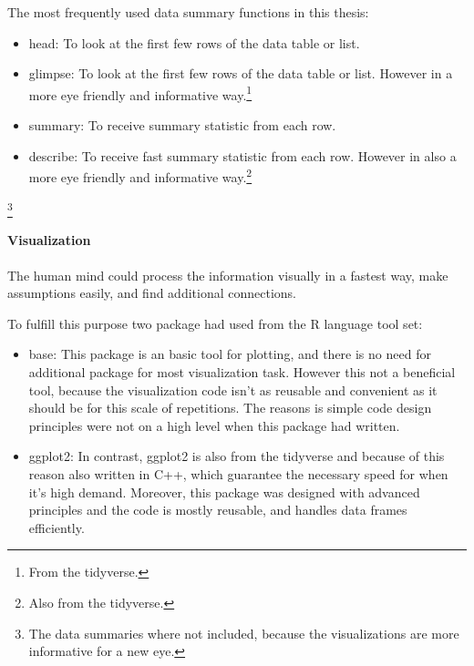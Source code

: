 		The most frequently used data summary functions in this thesis:
		\begin{itemize}
			\item{head:} To look at the first few rows of the data table or list.
			\item{glimpse:} To look at the first few rows of the data table or list. However in a more eye friendly and informative way.\footnote{From the tidyverse.}
			\item{summary:} To receive summary statistic from each row.
			\item{describe:} To receive fast summary statistic from each row. However in also a more eye friendly and informative way.\footnote{Also from the tidyverse.}
		\end{itemize}

		\footnote{The data summaries where not included, because the visualizations are more informative for a new eye.}
		\paragraph{Visualization}
		The human mind could process the information visually in a fastest way, make assumptions easily, and find additional connections. 

		To fulfill this purpose two package had used from the R language tool set:
		\begin{itemize}
			\item{base:} This package is an basic tool for plotting, and there is no need for additional package for most visualization task. However this not a beneficial tool, because the visualization code isn't as reusable and convenient as it should be for this scale of repetitions. The reasons is simple code design principles were not on a high level when this package had written.
			\item{ggplot2:} In contrast, ggplot2 is also from the tidyverse and because of this reason also written in C++, which guarantee the necessary speed for when it's high demand. Moreover, this package was designed with advanced principles and the code is mostly reusable, and handles data frames efficiently. 
		\end{itemize} 



